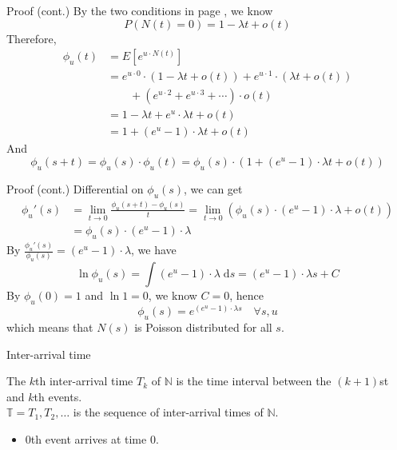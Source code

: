 \documentclass[mathserif]{beamer}
\begin{document}
\begin{frame}{Proof (cont.)}
By the two conditions in page \pageref{operation_def}, we know
\[
P(N(t) = 0) = 1 - \lambda t + o(t)
\]
Therefore,
\begin{align*}
\phi_u(t) & = E[e^{u\cdot N(t)}] \\
& = e^{u\cdot 0}\cdot (1 - \lambda t + o(t)) + e^{u\cdot 1}\cdot (\lambda t + o(t)) \\
& \qquad + (e^{u\cdot 2} + e^{u\cdot 3} + \cdots)\cdot o(t) \\
& = 1 - \lambda t + e^u \cdot \lambda t + o(t) \\
& = 1 + (e^u - 1)\cdot \lambda t + o(t)
\end{align*}
And
\[
\phi_u(s+t) = \phi_u(s)\cdot \phi_u(t) = \phi_u(s)\cdot (1 + (e^u - 1)\cdot \lambda t + o(t))
\]
\end{frame}

\begin{frame}{Proof (cont.)}
Differential on $\phi_u(s)$, we can get
\begin{align*}
{\phi_u}'(s) & = \lim_{t\to 0}\frac{\phi_u(s+t) - \phi_u(s)}{t}
 = \lim_{t\to 0}(\phi_u(s)\cdot (e^u - 1)\cdot \lambda + o(t)) \\
& = \phi_u(s)\cdot (e^u - 1)\cdot \lambda
\end{align*}
By $\frac{{\phi_u}'(s)}{\phi_u(s)} = (e^u - 1)\cdot \lambda$, we have
\[
\ln \phi_u(s) = \int (e^u - 1)\cdot \lambda \; \mathrm{d}s = (e^u - 1)\cdot \lambda s + C
\]
By $\phi_u(0) = 1$ and $\ln 1 = 0$, we know $C = 0$, hence
\[
\phi_u(s) = e^{(e^u - 1)\cdot \lambda s} \quad\forall s, u
\]
which means that $N(s)$ is Poisson distributed for all $s$.
\end{frame}

\begin{frame}{Inter-arrival time}
\begin{definition}
The $k$th inter-arrival time $T_k$ of $\mathbb{N}$ is the time interval between the $(k+1)$st and $k$th events.\\
$\mathbb{T} = T_1, T_2, \ldots$ is the sequence of inter-arrival times of $\mathbb{N}$.
\end{definition}
\begin{itemize}
\item $0$th event arrives at time $0$.
\end{itemize}
\end{frame}
\end{document}
